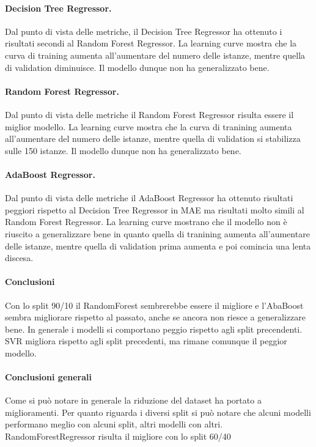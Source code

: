 \paragraph{\textbf{Decision Tree Regressor}.}
Dal punto di vista delle metriche, il Decision Tree Regressor ha ottenuto i risultati secondi al Random Forest Regressor. 
La learning curve mostra che la curva di training aumenta all'aumentare del numero delle istanze, mentre quella di validation diminuisce. Il modello dunque non ha generalizzato bene.
\paragraph{\textbf{Random Forest Regressor}.}
Dal punto di vista delle metriche il Random Forest Regressor risulta essere il miglior modello.
La learning curve mostra che la curva di tranining aumenta all'aumentare del numero delle istanze, mentre quella di validation si stabilizza sulle 150 istanze. Il modello dunque non ha generalizzato bene.
\paragraph{\textbf{AdaBoost Regressor}.}
Dal punto di vista delle metriche il AdaBoost Regressor ha ottenuto risultati peggiori rispetto al Decision Tree Regressor in MAE ma risultati molto simili al Random Forest Regressor.
La learning curve mostrano che il modello non è riuscito a generalizzare bene in quanto quella di tranining aumenta all'aumentare delle istanze, mentre quella di validation prima aumenta e poi comincia una lenta discesa.

\paragraph{\textbf{Conclusioni}} Con lo split 90/10 il RandomForest sembrerebbe essere il migliore e l'AbaBoost sembra migliorare rispetto al passato, anche se ancora non riesce a generalizzare bene. In generale i modelli si comportano peggio rispetto agli split precendenti.
SVR migliora rispetto agli split precedenti, ma rimane comunque il peggior modello.


\noindent
\paragraph{\textbf{Conclusioni generali}}
Come si può notare in generale la riduzione del dataset ha portato a miglioramenti. Per quanto riguarda i diversi split si può notare che alcuni modelli performano meglio con alcuni split, altri modelli con altri. RandomForestRegressor risulta il migliore con lo split 60/40

